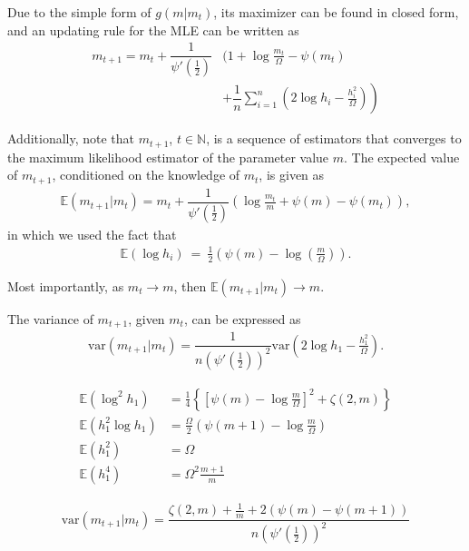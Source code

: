 \documentclass[conference, 10pt]{IEEEtran}
\begin{document}
Due to the simple form of $g(m | m_t)$, its maximizer can be found in closed form, and
an updating rule for the MLE can be written as
\begin{align}
    m_{t+1} = m_t + \dfrac{1}{\psi'(\frac{1}{2})}&\left.\Bigg(1 + \log \frac{m_t}{\Omega} - \psi(m_t) \right.\nonumber\\
    &\left.+ \dfrac{1}{n} \sum_{i=1}^{n}\left(2\log h_i - \frac{h_i^2}{\Omega}\right)\right)
\end{align}

Additionally,
note that $m_{t+1}$, $t \in \mathbb{N}$, is a sequence of estimators that converges to the maximum
likelihood estimator of the parameter value $m$.
The expected value of $m_{t+1}$, conditioned on the knowledge of $m_t$, is given as
\begin{align}
    \mathbb{E}(m_{t+1} | m_t) = m_t + \dfrac{1}{\psi'(\frac{1}{2})}\left(\log \frac{m_t}{m} + \psi(m) - \psi(m_t)\right),
\end{align}
in which we used the fact that~\cite{gradshteyn2007}
\begin{align}
    \mathbb{E}\left(\log h_i\right)~=~\frac{1}{2}\left(\psi(m)-\log\left(\frac{m}{\Omega}\right)\right).
\end{align}

Most importantly, as $m_t \rightarrow m$, then $\mathbb{E}(m_{t+1} | m_t) \rightarrow m$.

The variance of $m_{t+1}$, given $m_t$, can be expressed as
\begin{align}
    \mathrm{var}(m_{t+1} | m_t) = \dfrac{1}{n\left(\psi'(\frac{1}{2})\right)^2}
    \mathrm{var}\left(2\log h_1 - \frac{h_1^2}{\Omega}\right).
\end{align}

\begin{align}
    \mathbb{E}\left(\log ^ 2 h_1\right) &= \frac{1}{4}\left\{\left[\psi(m) - \log\frac{m}{\Omega}\right]^2 + \zeta(2, m)\right\}\\
    \mathbb{E}\left(h_1^2\log h_1\right) &= \frac{\Omega}{2}\left(\psi(m+1) - \log\frac{m}{\Omega}\right)\\
    \mathbb{E}\left(h_1^2\right) &= \Omega\\
    \mathbb{E}\left(h_1^4\right) &= \Omega^2\frac{m+1}{m}
\end{align}

\begin{align}
    \mathrm{var}(m_{t+1} | m_t) = \dfrac{\zeta(2, m) + \frac{1}{m} + 2 (\psi(m) - \psi(m+1))}{n\left(\psi'(\frac{1}{2})\right)^2}
\end{align}
\end{document}
